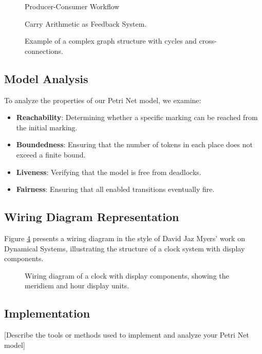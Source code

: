 \begin{figure}[htbp]

\caption{Producer-Consumer Workflow}
\label{fig:producer_consumer_workflow}
\end{figure}

\begin{figure}[htbp]
\centering

\caption{Carry Arithmetic as Feedback System.}
\label{fig:carry_arithmetic_feedback}
\end{figure}

\begin{figure}[htbp]
\centering
\resizebox{0.9\columnwidth}{!}{}
\caption{Example of a complex graph structure with cycles and cross-connections.}
\label{fig:complex_graph_example}
\end{figure}

\subsection{Model Analysis}

To analyze the properties of our Petri Net model, we examine:

\begin{itemize}
    \item \textbf{Reachability}: Determining whether a specific marking can be reached from the initial marking.
    \item \textbf{Boundedness}: Ensuring that the number of tokens in each place does not exceed a finite bound.
    \item \textbf{Liveness}: Verifying that the model is free from deadlocks.
    \item \textbf{Fairness}: Ensuring that all enabled transitions eventually fire.
\end{itemize}

\subsection{Wiring Diagram Representation}

Figure \ref{fig:clock_with_display} presents a wiring diagram in the style of David Jaz Myers' work on Dynamical Systems, illustrating the structure of a clock system with display components.

\begin{figure}[htbp]
\centering

\caption{Wiring diagram of a clock with display components, showing the meridiem and hour display units.}
\label{fig:clock_with_display}
\end{figure}

\subsection{Implementation}

[Describe the tools or methods used to implement and analyze your Petri Net model]